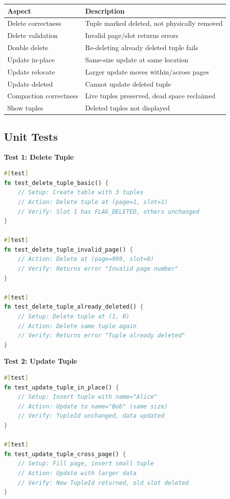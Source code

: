 \documentclass[11pt,a4paper]{article}
\begin{document}
\begin{table}[H]
\centering
\begin{tabular}{@{}ll@{}}
\toprule
\textbf{Aspect} & \textbf{Description} \\
\midrule
Delete correctness & Tuple marked deleted, not physically removed \\
Delete validation & Invalid page/slot returns errors \\
Double delete & Re-deleting already deleted tuple fails \\
Update in-place & Same-size update at same location \\
Update relocate & Larger update moves within/across pages \\
Update deleted & Cannot update deleted tuple \\
Compaction correctness & Live tuples preserved, dead space reclaimed \\
Show tuples & Deleted tuples not displayed \\
\bottomrule
\end{tabular}
\end{table}

\subsection{Unit Tests}

\textbf{Test 1: Delete Tuple}
\begin{lstlisting}[language=Rust]
#[test]
fn test_delete_tuple_basic() {
    // Setup: Create table with 3 tuples
    // Action: Delete tuple at (page=1, slot=1)
    // Verify: Slot 1 has FLAG_DELETED, others unchanged
}

#[test]
fn test_delete_tuple_invalid_page() {
    // Action: Delete at (page=999, slot=0)
    // Verify: Returns error "Invalid page number"
}

#[test]
fn test_delete_tuple_already_deleted() {
    // Setup: Delete tuple at (1, 0)
    // Action: Delete same tuple again
    // Verify: Returns error "Tuple already deleted"
}
\end{lstlisting}

\textbf{Test 2: Update Tuple}
\begin{lstlisting}[language=Rust]
#[test]
fn test_update_tuple_in_place() {
    // Setup: Insert tuple with name="Alice"
    // Action: Update to name="Bob" (same size)
    // Verify: TupleId unchanged, data updated
}

#[test]
fn test_update_tuple_cross_page() {
    // Setup: Fill page, insert small tuple
    // Action: Update with larger data
    // Verify: New TupleId returned, old slot deleted
}
\end{lstlisting}
\end{document}
